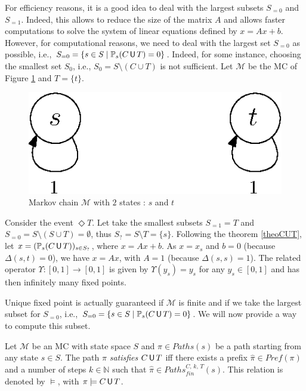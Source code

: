 \begin{remark}[\textit{Choosing $S_{=0}$ and $S_{=1}$}]\label{remarkS0S1}
For efficiency reasons, it is a good idea to deal with the largest subsets $S_{=0}$ and $S_{=1}$. Indeed, this allows to reduce
the size of the matrix $A$ and allows faster computations to solve the system of linear equations defined by $x = Ax + b$.
However, for computational reasons, we need to deal with the largest set $S_{=0}$ as possible, i.e., $S_{=0} = \{ s \in S \; | \; \mathbb{P}_s(C \,\text{\sffamily U}\, T) = 0 \}$. Indeed, for some instance, choosing the smallest set $S_0$, i.e., $S_0 = S \setminus (C \cup T)$ is not sufficient.
Let $\mathcal{M}$ be the MC of Figure \ref{s0s1} and $T = \{t\}$.
\begin{figure}[h]
  \centering
  \includegraphics[width=0.3\linewidth]{resources/S0S1}
  \caption{Markov chain $\mathcal{M}$ with $2$ states : $s$ and $t$}\label{s0s1}
\end{figure}
Consider the event $\Diamond T$. Let take the smallest subsets $S_{=1} = T$ and $S_{=0} = S \setminus (S \cup T) = \emptyset$, thus $S_? = S \setminus T = \{s\}$. Following the theorem \ref{theoCUT}, let $x = (\mathbb{P}_s(C \,\text{\sffamily U}\, T))_{s \in S_?}$, where $x = Ax+b$. As $x=x_s$ and $b = 0$ (because $\Delta(s, t) = 0$),
we have $x = Ax$, with $A = 1$ (because $\Delta(s, s) = 1$). The related operator $\Upsilon:[0, 1] \rightarrow [0,1]$ is given by $\Upsilon(y_s) = y_s$ for any $y_s \in [0, 1]$ and has then infinitely many fixed points.
\end{remark}
Unique fixed point is actually guaranteed if $\mathcal{M}$ is finite and if we take the largest subset for $S_{=0}$, i.e., $S_{=0}=\{s \in S \; | \; \mathbb{P}_s(C \,\text{\sffamily U}\, T) =0 \}$. We will now provide a way to compute this subset.
\begin{definition}
Let $\mathcal{M}$ be an MC with state space $S$ and $\pi \in Paths(s)$ be a path starting from any state $s \in S$. The path $\pi$ \textit{satisfies} $C \,\text{\sffamily U}\, T$ iff there exists a prefix $\hat{\pi}\in Pref(\pi)$ and a number of steps $k \in \mathbb{N}$ such that $\hat{\pi} \in Paths_{fin}^{C,\, k,\, T}(s)$. This relation is denoted by $\models$, with $\pi \models C \,\text{\sffamily U}\, T$.
\end{definition}
